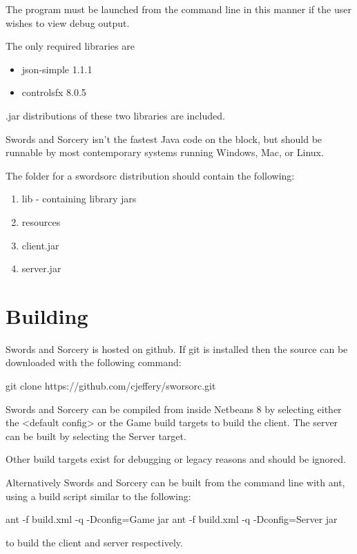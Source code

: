 \documentclass[12pt,a4paper]{article}
\begin{document}
The program must be launched from the command line in this manner if the user
wishes to view debug output.

The only required libraries are

\begin{itemize}
	\item json-simple 1.1.1
	\item controlsfx 8.0.5
\end{itemize}

.jar distributions of these two libraries are included.

Swords and Sorcery isn't the fastest Java code on the block, but should be
runnable by most contemporary systems running Windows, Mac, or Linux.

The folder for a swordsorc distribution should contain the following:

\begin{enumerate}
\item{lib - containing library jars}
\item{resources}
\item{client.jar}
\item{server.jar}
\end{enumerate}
\section{Building}
Swords and Sorcery is hosted on github. If git is installed then the source can
be downloaded with the following command:

    git clone https://github.com/cjeffery/sworsorc.git

Swords and Sorcery can be compiled from inside Netbeans 8 by selecting either
the <default config> or the Game build targets to build the client. The server
can be built by selecting the Server target.

Other build targets exist for debugging or legacy reasons and should be ignored.

Alternatively Swords and Sorcery can be built from the command line with ant,
using a build script similar to the following:

    ant -f build.xml -q -Dconfig=Game jar
    ant -f build.xml -q -Dconfig=Server jar

to build the client and server respectively.
\end{document}
